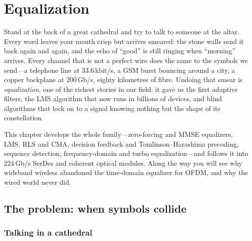 \chapter{Equalization}
\label{ch:equalization}

\begin{chapterintro}
Stand at the back of a great cathedral and try to talk to someone at the altar. Every word leaves
your mouth crisp but arrives smeared: the stone walls send it back again and again, and the echo of
``good'' is still ringing when ``morning'' arrives. Every channel that is not a perfect wire does
the same to the symbols we send---a telephone line at 33.6\,kbit/s, a GSM burst bouncing around a
city, a copper backplane at 200\,Gb/s, eighty kilometres of fibre. Undoing that smear is
\emph{equalization}, one of the richest stories in our field: it gave us the first adaptive
filters, the LMS algorithm that now runs in billions of devices, and blind algorithms that lock on
to a signal knowing nothing but the shape of its constellation.

This chapter develops the whole family---zero-forcing and MMSE equalizers, LMS, RLS and CMA,
decision feedback and Tomlinson--Harashima precoding, sequence detection, frequency-domain and
turbo equalization---and follows it into 224\,Gb/s SerDes and coherent optical modules. Along the way
you will see why wideband wireless abandoned the time-domain equalizer for OFDM, and why the wired
world never did.
\end{chapterintro}


\section{The problem: when symbols collide}
\label{sec:ch12:intro}

\subsection{Talking in a cathedral}

